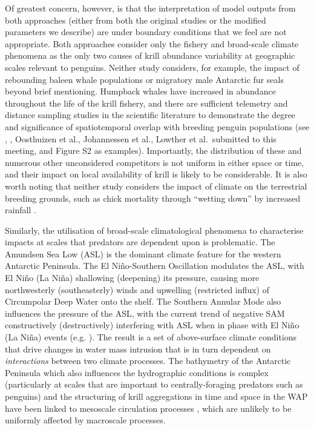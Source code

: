 \documentclass[]{elsarticle} %
\begin{document}
Of greatest concern, however, is that the interpretation of model
outputs from both approaches (either from both the original studies or
the modified parameters we describe) are under boundary conditions that
we feel are not appropriate. Both approaches consider only the fishery
and broad-scale climate phenomena as the only two causes of krill
abundance variability at geographic scales relevant to penguins. Neither
study considers, for example, the impact of rebounding baleen whale
populations or migratory male Antarctic fur seals beyond brief
mentioning. Humpback whales have increased in abundance throughout the
life of the krill fishery, and there are sufficient telemetry and
distance sampling studies in the scientific literature to demonstrate
the degree and significance of spatiotemporal overlap with breeding
penguin populations (see \citet{Santora2013}, \citet{Lowther2020},
Oosthuizen et al., Johannessen et al., Lowther et al.~submitted to this
meeting, and Figure S2 as examples). Importantly, the distribution of
these and numerous other unconsidered competitors is not uniform in
either space or time, and their impact on local availability of krill is
likely to be considerable. It is also worth noting that neither study
considers the impact of climate on the terrestrial breeding grounds,
such as chick mortality through ``wetting down'' by increased rainfall
\citep{chapmanMarineTerrestrialFactors2011}.

Similarly, the utilisation of broad-scale climatological phenomena to
characterise impacts at scales that predators are dependent upon is
problematic. The Amundsen Sea Low (ASL) is the dominant climate feature
for the western Antarctic Peninsula. The El Niño-Southern Oscillation
modulates the ASL, with El Niño (La Niña) shallowing (deepening) its
pressure, causing more northwesterly (southeasterly) winds and upwelling
(restricted influx) of Circumpolar Deep Water onto the shelf. The
Southern Annular Mode also influences the pressure of the ASL, with the
current trend of negative SAM constructively (destructively) interfering
with ASL when in phase with El Niño (La Niña) events (e.g.
\citet{Clem2016}). The result is a set of above-surface climate
conditions that drive changes in water mass intrusion that is in turn
dependent on \emph{interactions} between two climate processes. The
bathymetry of the Antarctic Peninsula which also influences the
hydrographic conditions is complex (particularly at scales that are
important to centrally-foraging predators such as penguins) and the
structuring of krill aggregations in time and space in the WAP have been
linked to mesoscale circulation processes
\citep{santoraKrillSpaceComparative2012}, which are unlikely to be
uniformly affected by macroscale processes.
\end{document}
